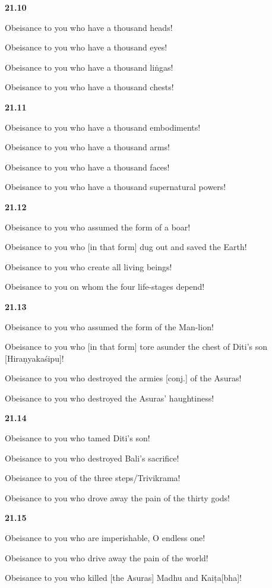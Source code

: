 \documentclass[12pt]{article} %
\begin{document}
\textbf{21.10}

 Obeisance to you who have a thousand heads! 

      Obeisance to you who have a thousand eyes! 

      Obeisance to you who have a thousand liṅgas! 

      Obeisance to you who have a thousand chests! 

\textbf{21.11}

 Obeisance to you who have a thousand embodiments! 

      Obeisance to you who have a thousand arms! 

      Obeisance to you who have a thousand faces! 

      Obeisance to you who have a thousand supernatural powers! 

\textbf{21.12}

 Obeisance to you who assumed the form of a boar! 

      Obeisance to you who [in that form] dug out and saved the Earth! 

      Obeisance to you who create all living beings! 

      Obeisance to you on whom the four life-stages depend! 

\textbf{21.13}

 Obeisance to you who assumed the form of the Man-lion! 

      Obeisance to you who [in that form] tore asunder the chest of Diti's son 
      [Hiraṇyakaśipu]! 
      
      Obeisance to you who destroyed the armies [conj.] of the Asuras! 
      
      Obeisance to you who destroyed the Asuras' haughtiness! 

\textbf{21.14}

 Obeisance to you who tamed Diti's son! 

      Obeisance to you who destroyed Bali's sacrifice! 

      Obeisance to you of the three steps/Trivikrama! 

      Obeisance to you who drove away the pain of the thirty gods! 

\textbf{21.15}

 Obeisance to you who are imperishable, O endless one! 

      Obeisance to you who drive away the pain of the world! 

      Obeisance to you who killed [the Asuras] Madhu and Kaiṭa[bha]! 
\end{document}
